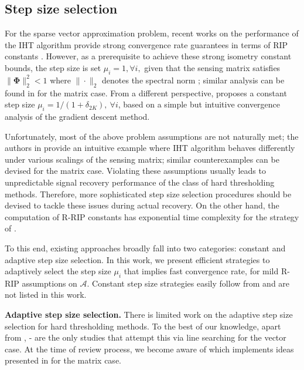 \documentclass[twocolumn]{svjour3}
\newcommand{\vectornorm}[1]{\|#1\|}
\newcommand{\sensing}{\boldsymbol{\mathcal{A}}}
\begin{document}
\subsection{Step size selection}

For the sparse vector approximation problem, recent works on the performance of the IHT algorithm provide strong convergence rate guarantees in terms of RIP constants \cite{Blumensath_iterativehard}. However, as a prerequisite to achieve these strong isometry constant bounds, the step size is set $ \mu_i = 1, \forall i, $ given that the sensing matrix satisfies $ \vectornorm{\boldsymbol{\Phi}}_2^2 < 1 $ where $\vectornorm{\cdot}_2$ denotes the spectral norm \cite{HTP}; similar analysis can be found in \cite{SVP} for the matrix case. From a different perspective, \cite{garg2009gradient} proposes a constant step size $ \mu_i = 1/(1+\delta_{2K}), ~\forall i $, based on a simple but intuitive convergence analysis of the gradient descent method. 

Unfortunately, most of the above problem assumptions are not naturally met; the authors in \cite{NIHT} provide an intuitive example where IHT algorithm behaves differently under various scalings of the sensing matrix; similar counterexamples can be devised for the matrix case. Violating these assumptions usually leads to unpredictable signal recovery performance of the class of hard thresholding methods. 
Therefore, more sophisticated step size selection procedures should be devised to tackle these issues during actual recovery. On the other hand, the computation of R-RIP constants has exponential time complexity for the strategy of \cite{SVP}. 

To this end, existing approaches broadly fall into two categories: constant and adaptive step size selection. In this work, we present efficient strategies to adaptively select the step size $ \mu_i $ that implies fast convergence rate, for mild R-RIP assumptions on $ \sensing $. Constant step size strategies easily follow from \cite{KyrillidisCevherRecipes} and are not listed in this work. 

\textbf{Adaptive step size selection.} 
There is limited work on the adaptive step size selection for hard thresholding methods. To the best of our knowledge, apart from \cite{KyrillidisCevherRecipes}, \cite{NIHT}-\cite{AIHT} are the only studies that attempt this via line searching for the vector case. At the time of review process, we become aware of \cite{tannernormalized} which implements ideas presented in \cite{NIHT} for the matrix case.
\end{document}
